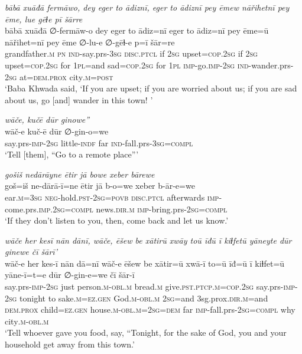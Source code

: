 \ea \label{BP.160}
\textit{bābā xuāđā fermāwo, dey eger to ādiznī, eger to ādiznī pey ēmew nāřihetnī pey ēme, lue gēɫe pī šārre} \\ 
\gll bābā xuāđā ∅-fermāw-o dey eger to ādiz=nī eger to ādiz=nī pey ēme=ū nāřihet=nī pey ēme ∅-lu-e ∅-gēɫ-e p=ī šār=re \\ 
 grandfather\textsc{.m} \textsc{pn} \textsc{ind-}say.prs\textsc{-3sg} \textsc{disc.ptcl} if \textsc{2sg} upset\textsc{=cop}\textsc{.\textsc{2sg}} if \textsc{2sg} upset\textsc{=cop}\textsc{.\textsc{2sg}} for \textsc{1pl}=and sad\textsc{=cop}\textsc{.\textsc{2sg}} for \textsc{1pl} \textsc{imp-}go.\textsc{imp-}\textsc{2sg} \textsc{ind-}wander.prs-\textsc{2sg} at=\textsc{dem.prox} city\textsc{.m}\textsc{=\textsc{post}} \\ 
\glt `Baba Khwada said, ‘If you are upset; if you are worried about us; if you are sad about us, go [and] wander in this town! '
\z 
 
\ea \label{BP.162}
\textit{wāče, kučē dūr ginowe”} \\ 
\gll wāč-e kuč-ē dūr ∅-gin-o=we \\ 
 say.prs-\textsc{imp-}\textsc{2sg} little\textsc{-indf} far \textsc{ind-}fall.prs\textsc{-3sg}\textsc{=compl} \\ 
\glt `Tell [them], “Go to a remote place”'
\z 
 
\ea \label{BP.164}
\textit{gošiš nedārāyne ētir jā bowe xeber bārewe} \\ 
\gll goš=iš ne-dārā-ī=ne ētir jā b-o=we xeber b-ār-e=we \\ 
 ear\textsc{.m}\textsc{=3sg} \textsc{neg-}hold\textsc{.pst}-\textsc{2sg}\textsc{=\textsc{povb}} \textsc{disc.ptcl} afterwards \textsc{imp-}come.prs\textsc{.imp}\textsc{.\textsc{2sg}}\textsc{=compl} news\textsc{.dir}\textsc{.m} \textsc{imp-}bring.prs-\textsc{2sg}\textsc{=compl} \\ 
\glt `If they don’t listen to you, then, come back and let us know.'
\z 
 
\ea \label{BP.165}
\textit{wāče her kesī nān dānī, wāče, ēšew be xātirū xwāy toū īđū ī kiɫfetū yāneyte dūr ginewe čī šārī’} \\ 
\gll wāč-e her kes-ī nān dā=nī wāč-e ēšew be xātir=ū xwā-ī to=ū īđ=ū ī kiɫfet=ū yāne-ī=t=e dūr ∅-gin-e=we čī šār-ī \\ 
 say.prs-\textsc{imp-}\textsc{2sg} just person\textsc{.m}\textsc{-obl}\textsc{.m} bread\textsc{.m} give\textsc{.pst}\textsc{.ptcp}\textsc{.m}\textsc{=cop}\textsc{.\textsc{2sg}} say.prs-\textsc{imp-}\textsc{2sg} tonight to sake\textsc{.m}\textsc{=ez.gen} God\textsc{.m}\textsc{-obl}\textsc{.m} \textsc{2sg}=and 3sg.prox\textsc{.dir}\textsc{.m}=and \textsc{dem.prox} child\textsc{=ez.gen} house\textsc{.m}\textsc{-obl}\textsc{.m}\textsc{=\textsc{2sg}}\textsc{=dem} far \textsc{imp-}fall.prs-\textsc{2sg}\textsc{=compl} why city\textsc{.m}\textsc{-obl}\textsc{.m} \\ 
\glt `Tell whoever gave you food, say, “Tonight, for the sake of God, you and your household get away from this town.'
\z 
 
